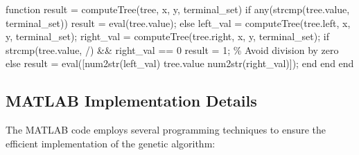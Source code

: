 \documentclass[
  letterpaper,
  DIV=11,
  numbers=noendperiod]{scrartcl}
\newenvironment{Shaded}{\begin{snugshade}}{\end{snugshade}}
\newcommand{\CommentTok}[1]{\textcolor[rgb]{0.37,0.37,0.37}{#1}}
\newcommand{\FloatTok}[1]{\textcolor[rgb]{0.68,0.00,0.00}{#1}}
\newcommand{\KeywordTok}[1]{\textcolor[rgb]{0.00,0.23,0.31}{#1}}
\newcommand{\NormalTok}[1]{\textcolor[rgb]{0.00,0.23,0.31}{#1}}
\newcommand{\OperatorTok}[1]{\textcolor[rgb]{0.37,0.37,0.37}{#1}}
\newcommand{\SpecialStringTok}[1]{\textcolor[rgb]{0.13,0.47,0.30}{#1}}
\newcommand{\VariableTok}[1]{\textcolor[rgb]{0.07,0.07,0.07}{#1}}
\begin{document}
\begin{Shaded}
\begin{Highlighting}[]
\KeywordTok{function} \VariableTok{result} \OperatorTok{=} \VariableTok{computeTree}\NormalTok{(}\VariableTok{tree}\OperatorTok{,} \VariableTok{x}\OperatorTok{,} \VariableTok{y}\OperatorTok{,} \VariableTok{terminal\_set}\NormalTok{)}
    \KeywordTok{if} \VariableTok{any}\NormalTok{(}\VariableTok{strcmp}\NormalTok{(}\VariableTok{tree}\NormalTok{.}\VariableTok{value}\OperatorTok{,} \VariableTok{terminal\_set}\NormalTok{))}
        \VariableTok{result} \OperatorTok{=} \VariableTok{eval}\NormalTok{(}\VariableTok{tree}\NormalTok{.}\VariableTok{value}\NormalTok{)}\OperatorTok{;}
    \KeywordTok{else}
        \VariableTok{left\_val} \OperatorTok{=} \VariableTok{computeTree}\NormalTok{(}\VariableTok{tree}\NormalTok{.}\VariableTok{left}\OperatorTok{,} \VariableTok{x}\OperatorTok{,} \VariableTok{y}\OperatorTok{,} \VariableTok{terminal\_set}\NormalTok{)}\OperatorTok{;}
        \VariableTok{right\_val} \OperatorTok{=} \VariableTok{computeTree}\NormalTok{(}\VariableTok{tree}\NormalTok{.}\VariableTok{right}\OperatorTok{,} \VariableTok{x}\OperatorTok{,} \VariableTok{y}\OperatorTok{,} \VariableTok{terminal\_set}\NormalTok{)}\OperatorTok{;}
        \KeywordTok{if} \VariableTok{strcmp}\NormalTok{(}\VariableTok{tree}\NormalTok{.}\VariableTok{value}\OperatorTok{,} \SpecialStringTok{\textquotesingle{}/\textquotesingle{}}\NormalTok{) }\OperatorTok{\&\&} \VariableTok{right\_val} \OperatorTok{==} \FloatTok{0}
            \VariableTok{result} \OperatorTok{=} \FloatTok{1}\OperatorTok{;} \CommentTok{\% Avoid division by zero}
        \KeywordTok{else}
            \VariableTok{result} \OperatorTok{=} \VariableTok{eval}\NormalTok{([}\VariableTok{num2str}\NormalTok{(}\VariableTok{left\_val}\NormalTok{) }\VariableTok{tree}\NormalTok{.}\VariableTok{value} \VariableTok{num2str}\NormalTok{(}\VariableTok{right\_val}\NormalTok{)])}\OperatorTok{;}
        \KeywordTok{end}
    \KeywordTok{end}
\KeywordTok{end}
\end{Highlighting}
\end{Shaded}

\subsection{MATLAB Implementation
Details}\label{matlab-implementation-details}

The MATLAB code employs several programming techniques to ensure the
efficient implementation of the genetic algorithm:
\end{document}
